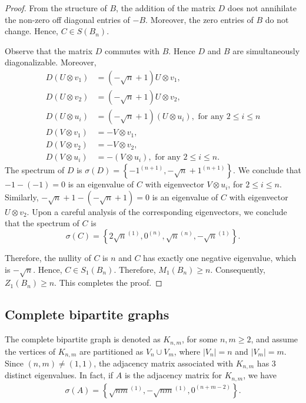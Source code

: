 \documentclass[3p,times,12pt]{article}
\begin{document}
\begin{proof}
		 From the structure of $B$, the addition of the matrix $D$ does not annihilate the non-zero off diagonal entries of $-B$. Moreover, the zero entries of $B$ do not change. Hence, $C \in S(B_n)$. 
		 
		 Observe that the matrix $D$ commutes with $B$. Hence $D$ and $B$ are simultaneously diagonalizable. Moreover, 
		 \begin{align*}
		 	D (U\otimes v_1) &= (-\sqrt{n} +1)U\otimes v_1,\\
		 	D (U\otimes v_2) &= (-\sqrt{n} +1)U\otimes v_2,\\
		 	D (U \otimes u_i) &= (-\sqrt{n} +1)(U \otimes u_i), \mbox{ for any } 2\leq i\leq n\\
		 	D (V\otimes v_1) &= -V\otimes v_1,\\
		 	D (V\otimes v_2) &= -V\otimes v_2,\\
		 	D (V \otimes u_i) &= -(V \otimes u_i), \mbox{ for any } 2\leq i\leq n.
		 \end{align*}%
		 The spectrum of $D$ is $\sigma(D) = \left\{ -1^{(n+1)}, -\sqrt{n}+1^{(n+1)} \right\}$. We conclude that $-1 - (-1) = 0$ is an eigenvalue of $C$ with eigenvector $V\otimes u_i$, for $2\leq i \leq n$. Similarly, $-\sqrt{n}+1 - \left(-\sqrt{n} + 1\right) = 0$ is an eigenvalue of $C$ with eigenvector $U\otimes v_2$. Upon a careful analysis of the corresponding eigenvectors, we conclude that the spectrum of $C$ is $$\sigma(C) = \left\{ 2\sqrt{n}^{(1)},0^{(n)}, \sqrt{n}^{(n)}, -\sqrt{n}^{(1)} \right\}.$$
		 
		Therefore, the nullity of $C$ is $n$ and $C$ has exactly one negative eigenvalue, which is $-\sqrt{n}$. Hence, $C\in S_1(B_n)$. Therefore, $M_1(B_n) \geq n$. Consequently, $Z_1(B_n)\geq n$. This completes the proof. 
	\end{proof}
	
	\subsection{Complete bipartite graphs}
The complete bipartite graph is denoted as $K_{n,m}$, for some $n,m\geq 2$, and assume the vertices of $K_{n,m}$ are partitioned as $V_n \cup V_m$, where $|V_n |=n$ and $|V_m |=m$. Since $(n,m) \neq (1,1)$, the adjacency matrix associated with $K_{n,m}$ has $3$ distinct eigenvalues. In fact, if $A$ is the adjacency matrix for $K_{n,m}$, we have 
	\begin{align*}
		\sigma(A) = \left\{ \sqrt{nm}^{(1)}, -\sqrt{nm}^{(1)}, 0^{(n+m-2)} \right\}.
	\end{align*}
	
\end{document}
